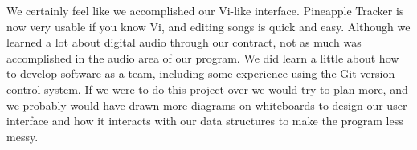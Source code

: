 \documentclass[12pt,letterpaper]{article}
\begin{document}
\par
We certainly feel like we accomplished our Vi-like interface.
Pineapple Tracker is now very usable if you know Vi, and editing songs is quick and easy.
Although we learned a lot about digital audio through our contract, not as much was accomplished in the audio area of our program.
We did learn a little about how to develop software as a team, including some experience using the Git version control system.
If we were to do this project over we would try to plan more, and we probably would have drawn more diagrams on whiteboards to design our user interface and how it interacts with our data structures to make the program less messy.
\end{document}
